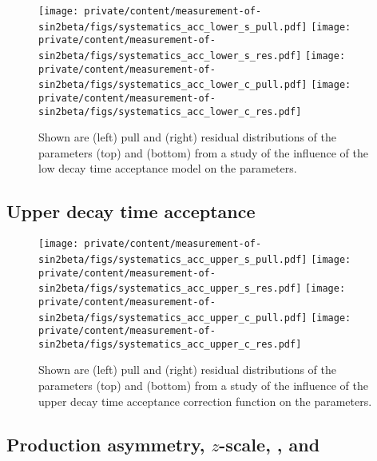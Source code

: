 \begin{figure}[h]
  \texttt{[image: private/content/measurement-of-sin2beta/figs/systematics\_acc\_lower\_s\_pull.pdf]}\hfill
  \texttt{[image: private/content/measurement-of-sin2beta/figs/systematics\_acc\_lower\_s\_res.pdf]}
  \texttt{[image: private/content/measurement-of-sin2beta/figs/systematics\_acc\_lower\_c\_pull.pdf]}\hfill
  \texttt{[image: private/content/measurement-of-sin2beta/figs/systematics\_acc\_lower\_c\_res.pdf]}
\caption{Shown are (left) pull and (right) residual distributions of the
parameters (top) \SJpsiKS and (bottom) \CJpsiKS from a \ToyMC study of the
influence of the low decay time acceptance model on the \CP parameters.}
\label{fig:app:measurement_of_sin2beta:systematics:systematics:acceptance:lower}
\end{figure}

\subsection{Upper decay time acceptance}
\label{sec:app:measurement_of_sin2beta:systematics:systematics:acceptance:upper}

\begin{figure}[h]
  \texttt{[image: private/content/measurement-of-sin2beta/figs/systematics\_acc\_upper\_s\_pull.pdf]}\hfill
  \texttt{[image: private/content/measurement-of-sin2beta/figs/systematics\_acc\_upper\_s\_res.pdf]}
  \texttt{[image: private/content/measurement-of-sin2beta/figs/systematics\_acc\_upper\_c\_pull.pdf]}\hfill
  \texttt{[image: private/content/measurement-of-sin2beta/figs/systematics\_acc\_upper\_c\_res.pdf]}
\caption{Shown are (left) pull and (right) residual distributions of the
parameters (top) \SJpsiKS and (bottom) \CJpsiKS from a \ToyMC study of the
influence of the upper decay time acceptance correction function on the \CP
parameters.}
\label{fig:app:measurement_of_sin2beta:systematics:systematics:acceptance:upper}
\end{figure}

\subsection[Production asymmetry, $z$-scale, DMd, and DGd]{Production asymmetry, $z$-scale, \DMd, and \DGd}
\label{sec:app:measurement_of_sin2beta:systematics:systematics:further_studies}
